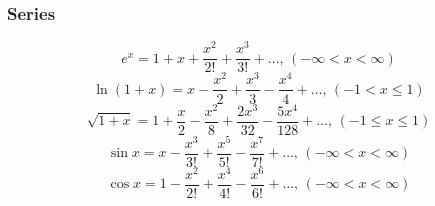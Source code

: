 \subsubsection{Series} 
$$e^x = 1+x+\frac{x^2}{2!}+\frac{x^3}{3!}+\dots,\,(-\infty<x<\infty)$$
$$\ln(1+x) = x-\frac{x^2}{2}+\frac{x^3}{3}-\frac{x^4}{4}+\dots,\,(-1<x\leq1)$$
$$\sqrt{1+x} = 1+\frac{x}{2}-\frac{x^2}{8}+\frac{2x^3}{32}-\frac{5x^4}{128}+\dots,\,(-1\leq x\leq1)$$
$$\sin x = x-\frac{x^3}{3!}+\frac{x^5}{5!}-\frac{x^7}{7!}+\dots,\,(-\infty<x<\infty)$$
$$\cos x = 1-\frac{x^2}{2!}+\frac{x^4}{4!}-\frac{x^6}{6!}+\dots,\,(-\infty<x<\infty)$$